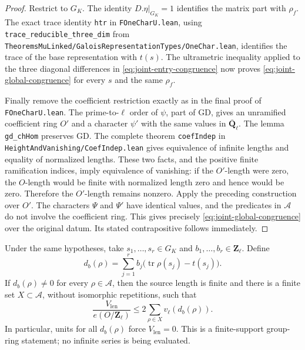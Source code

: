\begin{proof}
Restrict to $G_K$. The identity $D.\eta|_{G_K}=1$ identifies the matrix
part with $\rho_f$. The exact trace identity \texttt{htr} in
\texttt{FOneCharU.lean}, using
\texttt{trace\_reducible\_three\_dim} from
\texttt{TheoremsMuLinked/GaloisRepresentationTypes/OneChar.lean},
identifies the trace of the base representation with $t(s)$.
The ultrametric inequality applied to the three diagonal differences
in \eqref{eq:joint-entry-congruence} now proves
\eqref{eq:joint-global-congruence} for every $s$ and the same $\rho_f$.

Finally remove the coefficient restriction exactly as in the final
proof of \texttt{FOneCharU.lean}. The prime-to-$\ell$ order of $\psi$,
part of $\mathrm{GD}$, gives an unramified coefficient ring $O'$ and
a character $\psi'$ with the same values in
$\overline{\mathbf Q}_\ell$. The lemma \texttt{gd\_chHom} preserves
$\mathrm{GD}$. The complete theorem \texttt{coefIndep} in
\texttt{HeightAndVanishing/CoefIndep.lean} gives equivalence of
infinite lengths and equality of normalized lengths. These two facts,
and the positive finite ramification indices, imply equivalence of
vanishing: if the $O'$-length were zero, the $O$-length would be finite
with normalized length zero and hence would be zero. Therefore the
$O'$-length remains nonzero. Apply the preceding construction over
$O'$. The characters $\Psi$ and $\Psi'$ have identical values, and the
predicates in $\mathcal A$ do not involve the coefficient ring. This
gives precisely \eqref{eq:joint-global-congruence} over the original
datum. Its stated contrapositive follows immediately.
\end{proof}

\begin{proposition}\label{prop:step17-group-ring}
Under the same hypotheses, take $s_1,\ldots,s_r\in G_K$ and
$b_1,\ldots,b_r\in\mathbf Z_\ell$. Define
\[
 d_b(\rho)=\sum_{j=1}^r b_j
       \bigl(\operatorname{tr}\rho(s_j)-t(s_j)\bigr).
\]
If $d_b(\rho)\ne0$ for every $\rho\in\mathcal A$, then the source
length is finite and there is a finite set $X\subset\mathcal A$,
without isomorphic repetitions, such that
\begin{equation}\label{eq:group-ring-bound}
 \frac{V_{\mathrm{len}}}{e(O/\mathbf Z_\ell)}
       \le 2\sum_{\rho\in X}v_\ell(d_b(\rho)).
\end{equation}
In particular, units for all $d_b(\rho)$ force $V_{\mathrm{len}}=0$.
This is a finite-support group-ring statement; no infinite series is
being evaluated.
\end{proposition}

